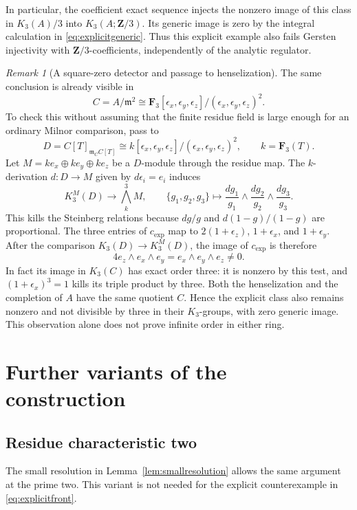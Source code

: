 \documentclass[11pt,a4paper]{article}
\theoremstyle{remark}
\newtheorem{remark}[theorem]{Remark}
\newcommand{\Z}{\mathbf Z}
\newcommand{\F}{\mathbf F}
\newcommand{\m}{\mathfrak m}
\begin{document}
In particular, the coefficient exact sequence injects the nonzero image of this class in $K_3(A)/3$ into $K_3(A;\Z/3)$. Its generic image is zero by the integral calculation in \eqref{eq:explicitgeneric}. Thus this explicit example also fails Gersten injectivity with $\Z/3$-coefficients, independently of the analytic regulator.

\begin{remark}[A square-zero detector and passage to henselization]
The same conclusion is already visible in
\[
C=A/\m^2\cong
\F_3[\epsilon_x,\epsilon_y,\epsilon_z]/(\epsilon_x,\epsilon_y,\epsilon_z)^2.
\]
To check this without assuming that the finite residue field is large enough for an ordinary Milnor comparison, pass to
\[
D=C[T]_{\m_C C[T]}
\cong k[\epsilon_x,\epsilon_y,\epsilon_z]/(\epsilon_x,\epsilon_y,\epsilon_z)^2,
\qquad k=\F_3(T).
\]
Let $M=k e_x\oplus k e_y\oplus k e_z$ be a $D$-module through the residue map. The $k$-derivation $d:D\to M$ given by $d\epsilon_i=e_i$ induces
\[
K_3^M(D)\longrightarrow\bigwedge_k^3 M,\qquad
\{g_1,g_2,g_3\}\longmapsto
\frac{dg_1}{g_1}\wedge\frac{dg_2}{g_2}\wedge\frac{dg_3}{g_3}.
\]
This kills the Steinberg relations because $dg/g$ and $d(1-g)/(1-g)$ are proportional. The three entries of $c_{\mathrm{exp}}$ map to $2(1+\epsilon_z)$, $1+\epsilon_x$, and $1+\epsilon_y$. After the comparison $K_3(D)\to K_3^M(D)$, the image of $c_{\mathrm{exp}}$ is therefore
\[
4e_z\wedge e_x\wedge e_y=e_x\wedge e_y\wedge e_z\ne0.
\]
In fact its image in $K_3(C)$ has exact order three: it is nonzero by this test, and $(1+\epsilon_x)^3=1$ kills its triple product by three. Both the henselization and the completion of $A$ have the same quotient $C$. Hence the explicit class also remains nonzero and not divisible by three in their $K_3$-groups, with zero generic image. This observation alone does not prove infinite order in either ring.
\end{remark}

\section{Further variants of the construction}

\subsection{Residue characteristic two}\label{sec:two}

The small resolution in Lemma~\ref{lem:smallresolution} allows the same argument at the prime two. This variant is not needed for the explicit counterexample in \eqref{eq:explicitfront}.
\end{document}
